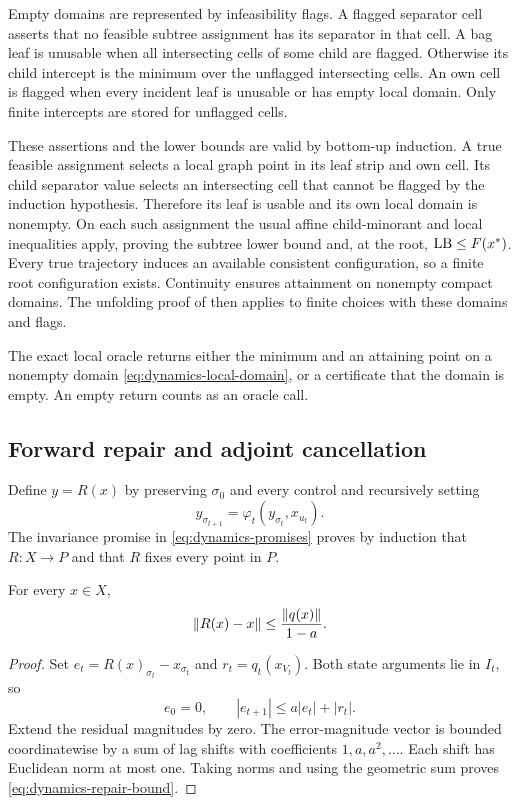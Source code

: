 Empty domains are represented by infeasibility flags. A flagged separator
cell asserts that no feasible subtree assignment has its separator in that
cell. A bag leaf is unusable when all intersecting cells of some child
are flagged. Otherwise its child intercept is the minimum over the
unflagged intersecting cells. An own cell is flagged when every incident
leaf is unusable or has empty local domain. Only finite intercepts are
stored for unflagged cells.

These assertions and the lower bounds are valid by bottom-up induction.
A true feasible assignment selects a local graph point in its leaf strip
and own cell. Its child separator value selects an intersecting cell that
cannot be flagged by the induction hypothesis. Therefore its leaf is
usable and its own local domain is nonempty. On each such assignment the
usual affine child-minorant and local inequalities apply, proving the
subtree lower bound and, at the root, $\mathrm{LB}\le F(x^*)$. Every true
trajectory induces an available consistent configuration, so a finite
root configuration exists. Continuity ensures attainment on nonempty
compact domains. The unfolding proof of  then applies
to finite choices with these domains and flags.

The exact local oracle returns either the minimum and an attaining point
on a nonempty domain \eqref{eq:dynamics-local-domain}, or a certificate
that the domain is empty. An empty return counts as an oracle call.

\subsection{Forward repair and adjoint cancellation}

Define $y=R(x)$ by preserving $\sigma_0$ and every control and recursively
setting
\begin{equation}\label{eq:dynamics-repair}
 y_{\sigma_{t+1}}=\varphi_t(y_{\sigma_t},x_{u_t}).
\end{equation}
The invariance promise in \eqref{eq:dynamics-promises} proves by induction
that $R:X\to P$ and that $R$ fixes every point in $P$.

\begin{lemma}\label{lem:dynamics-repair}
For every $x\in X$,
\begin{equation}\label{eq:dynamics-repair-bound}
 \left\lVert R(x)-x\right\rVert\le\frac{\left\lVert q(x)\right\rVert}{1-a}.
\end{equation}
\end{lemma}
\begin{proof}
Set $e_t=R(x)_{\sigma_t}-x_{\sigma_t}$ and
$r_t=q_t(x_{V_t})$. Both state arguments lie in $I_t$, so
\[
 e_0=0,\qquad
 |e_{t+1}|\le a|e_t|+|r_t|.
\]
Extend the residual magnitudes by zero. The error-magnitude vector is
bounded coordinatewise by a sum of lag shifts with coefficients
$1,a,a^2,\ldots$. Each shift has Euclidean norm at most one. Taking norms
and using the geometric sum proves \eqref{eq:dynamics-repair-bound}.
\end{proof}

